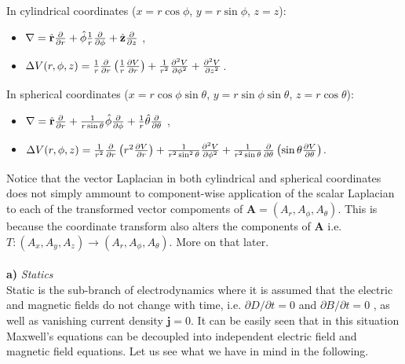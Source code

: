 In cylindrical coordinates ($x=r\cos\phi$, $y = r\sin\phi$, $z = z$): 
\begin{itemize}
  \item {$\mathbf{\nabla} = \hat{\mathbf {r}} \frac{\partial }{\partial r}+\hat{\mathbf{\phi}} \frac{1}{r}\frac{\partial}{\partial \mathbf{\phi}} + \hat{\mathbf{z}}\frac{\partial}{\partial z} $} ,
  \item {$\Delta V(r,\phi,z) = \frac{1}{r}\frac{\partial}{\partial r}\left ( \frac{1}{r}\frac{\partial V}{\partial r}\right ) + \frac{1}{r^2}\frac{\partial ^2 V}{\partial \phi ^2} + \frac{\partial ^2 V }{\partial z^2} $.}
\end{itemize}

In spherical coordinates ($x=r\cos\phi \sin\theta$, $y = r\sin\phi\sin\theta$, $z = r\cos\theta$):
\begin{itemize}
  \item{$\mathbf{\nabla} = \hat{\mathbf{r}} \frac{\partial }{\partial r}+\frac{1}{r\sin\theta}\hat{\mathbf{\phi}} \frac{\partial}{\partial \phi} + \frac{1}{r}\hat{\mathbf{\theta}}\frac{\partial}{\partial \theta}$} ,
  \item{$\Delta V(r,\phi,z) = \frac{1}{r^2}\frac{\partial}{\partial r}\left ( r^2\frac{\partial V}{\partial r}\right ) + \frac{1}{r^2 \sin^2\theta}\frac{\partial ^2 V}{\partial \phi ^2}
    + \frac{1}{r^2\sin\theta} \frac{\partial}{\partial \theta}\left ( \sin\theta \frac{\partial V}{\partial \theta } \right ) $.} 
\end{itemize}

Notice that the vector Laplacian in both cylindrical and spherical coordinates does not simply ammount to component-wise application of the scalar Laplacian to each of the transformed vector compoments of $\bm{A} = (A_r,A_\phi,A_\theta)$. This is because the coordinate transform also alters the components of $\bm{A}$ i.e. $T: (A_x,A_y,A_z)\rightarrow (A_r,A_\phi,A_\theta)$. More on that later. 
\\\\
\textbf{a)} \emph{Statics} \\

Static is the sub-branch of electrodynamics where it is assumed that the electric and magnetic fields do not change with time, i.e. $\partial D / \partial t = 0 $ and $\partial B / \partial t = 0 $ , as well as vanishing current density  $\bm{j} = 0 $. It can be easily seen that in this situation Maxwell's equations can be decoupled into independent electric field and magnetic field equations. Let us see what we have in mind in the following. 


